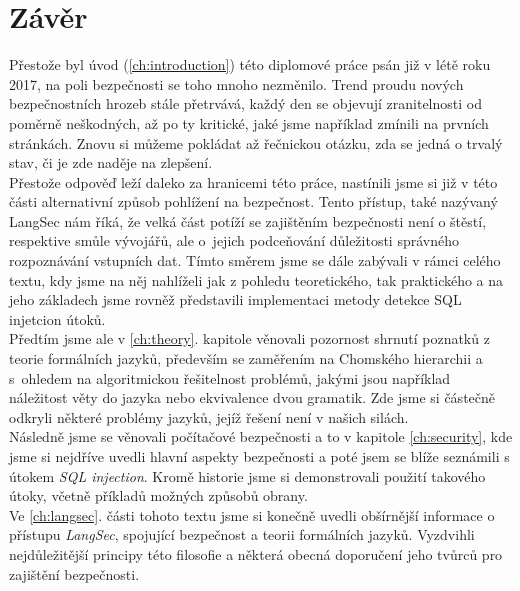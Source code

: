 
\chapter{Závěr} \label{ch:conclusion}
Přestože byl úvod (\ref{ch:introduction}) této diplomové práce psán již v létě roku 2017, na poli bezpečnosti se toho mnoho nezměnilo. Trend proudu 
nových bezpečnostních hrozeb stále přetrvává, každý den se objevují zranitelnosti od poměrně neškodných, až po ty kritické, jaké jsme například 
zmínili na prvních stránkách. Znovu si můžeme pokládat až řečnickou otázku, zda se jedná o trvalý stav, či je zde naděje na zlepšení. \\

Přestože odpověď leží daleko za hranicemi této práce, nastínili jsme si již v této části alternativní způsob pohlížení na bezpečnost. Tento přístup, 
také nazývaný LangSec nám říká, že velká část potíží se zajištěním bezpečnosti není o štěstí, respektive smůle vývojářů, ale o~jejich podceňování 
důležitosti správného rozpoznávání vstupních dat. Tímto směrem jsme se dále zabývali v rámci celého textu, kdy jsme na něj nahlíželi jak z pohledu 
teoretického, tak praktického a na jeho základech jsme rovněž představili implementaci metody detekce SQL injetcion útoků. \\

Předtím jsme ale v \ref{ch:theory}. kapitole věnovali pozornost shrnutí poznatků z teorie formálních jazyků, především se zaměřením na Chomského 
hierarchii a s~ohledem na algoritmickou řešitelnost problémů, jakými jsou například náležitost věty do jazyka nebo ekvivalence dvou gramatik. 
Zde jsme si částečně odkryli některé problémy jazyků, jejíž řešení není v našich silách. \\

Následně jsme se věnovali počítačové bezpečnosti a to v kapitole \ref{ch:security}, kde jsme si nejdříve uvedli hlavní aspekty bezpečnosti a poté 
jsem se blíže seznámili s útokem \textit{SQL injection}. Kromě historie jsme si demonstrovali použití takového útoky, včetně příkladů možných způsobů obrany. \\

Ve \ref{ch:langsec}. části tohoto textu jsme si konečně uvedli obšírnější informace o přístupu \textit{LangSec}, spojující bezpečnost a teorii formálních
jazyků. Vyzdvihli nejdůležitější principy této filosofie a některá obecná doporučení jeho tvůrců pro zajištění bezpečnosti. \\

